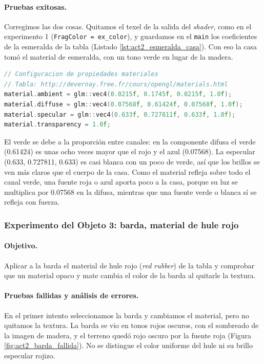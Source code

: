 \paragraph{Pruebas exitosas.}
Corregimos las dos cosas. Quitamos el texel de la salida del \textit{shader}, como en el experimento 1 (\texttt{FragColor = ex\_color}), y guardamos en el \texttt{main} los coeficientes de la esmeralda de la tabla (Listado \ref{lst:act2_esmeralda_casa}). Con eso la casa tomó el material de esmeralda, con un tono verde en lugar de la madera.

\begin{lstlisting}[language=C++, caption={Material de esmeralda aplicado a la casa, tomado de la tabla de materiales.}, label={lst:act2_esmeralda_casa}]
// Configuracion de propiedades materiales
// Tabla: http://devernay.free.fr/cours/opengl/materials.html
material.ambient = glm::vec4(0.0215f, 0.1745f, 0.0215f, 1.0f);
material.diffuse = glm::vec4(0.07568f, 0.61424f, 0.07568f, 1.0f);
material.specular = glm::vec4(0.633f, 0.727811f, 0.633f, 1.0f);
material.transparency = 1.0f;
\end{lstlisting}

El verde se debe a la proporción entre canales: en la componente difusa el verde (0.61424) es unas ocho veces mayor que el rojo y el azul (0.07568). La especular (0.633, 0.727811, 0.633) es casi blanca con un poco de verde, así que los brillos se ven más claros que el cuerpo de la casa. Como el material refleja sobre todo el canal verde, una fuente roja o azul aporta poco a la casa, porque su luz se multiplica por 0.07568 en la difusa, mientras que una fuente verde o blanca sí se refleja con fuerza.

\subsubsection{Experimento del Objeto 3: barda, material de hule rojo}
\paragraph{Objetivo.}
Aplicar a la barda el material de hule rojo (\textit{red rubber}) de la tabla \cite{devernay_materials} y comprobar que un material opaco y mate cambia el color de la barda al quitarle la textura.

\paragraph{Pruebas fallidas y análisis de errores.}
En el primer intento seleccionamos la barda y cambiamos el material, pero no quitamos la textura. La barda se vio en tonos rojos oscuros, con el sombreado de la imagen de madera, y el terreno quedó rojo oscuro por la fuente roja (Figura \ref{fig:act2_barda_fallida}). No se distingue el color uniforme del hule ni su brillo especular rojizo.


